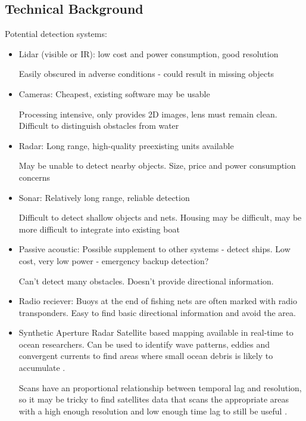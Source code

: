 \subsection{\label{sec:intro:technical-background}Technical Background}
Potential detection systems:
\begin{itemize}

\item Lidar (visible or IR): 
low cost and power consumption, good resolution

Easily obscured in adverse conditions - could result in missing objects

\item Cameras: 
Cheapest, existing software may be usable

Processing intensive, only provides 2D images, lens must remain clean.  Difficult to distinguish obstacles from water

\item Radar:
Long range, high-quality preexisting units available

May be unable to detect nearby objects.  Size, price and power consumption concerns

\item Sonar:
Relatively long range, reliable detection

Difficult to detect shallow objects and nets. Housing may be difficult, may be more difficult to integrate into existing boat

\item Passive acoustic:
Possible supplement to other systems - detect ships.  Low cost, very low power - emergency backup detection?

Can't detect many obstacles.  Doesn't provide directional information.

\item Radio reciever:
Buoys at the end of fishing nets are often marked with radio transponders. Easy to find basic directional information and avoid the area.

\item Synthetic Aperture Radar
Satellite based mapping available in real-time to ocean researchers. Can be used to identify wave patterns, eddies and convergent currents to find areas where small ocean debris is likely to accumulate \cite{SAR-manual}.

Scans have an proportional relationship between temporal lag and resolution, so it may be tricky to find satellites data that scans the appropriate areas with a high enough resolution and low enough time lag to still be useful \cite{Mace}.
\end{itemize}


